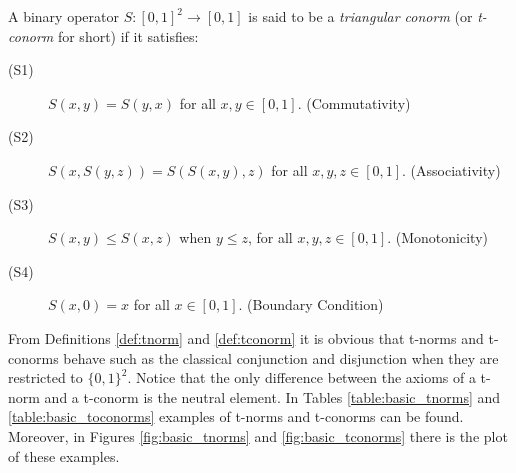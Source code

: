 \begin{definition}\label{def:tconorm}
	A binary operator $S:[0,1]^2 \to [0,1]$ is said to be a \emph{triangular conorm} (or \emph{t-conorm} for short) if it satisfies:
	\begin{description}
		\item[(S1)] $S(x,y)=S(y,x)$ for all $x,y \in [0,1]$. \hfill (Commutativity)
		\item[(S2)] $S(x,S(y,z))=S(S(x,y),z)$ for all $x,y,z \in [0,1]$. \hfill (Associativity)
		\item[(S3)] $S(x,y) \leq S(x,z)$ when $y \leq z$, for all $x,y,z \in [0,1]$. \hfill (Monotonicity)
		\item[(S4)] $S(x,0)=x$ for all $x \in [0,1]$. \hfill (Boundary Condition)
	\end{description}
\end{definition}

From Definitions \ref{def:tnorm} and \ref{def:tconorm} it is obvious that t-norms and t-conorms behave such as the classical conjunction and disjunction when they are restricted to $\{0,1\}^2$. Notice that the only difference between the axioms of a t-norm and a t-conorm is the neutral element. In Tables \ref{table:basic_tnorms} and  \ref{table:basic_toconorms} examples of t-norms and t-conorms can be found. Moreover, in Figures \ref{fig:basic_tnorms} and \ref{fig:basic_tconorms} there is the plot of these examples.

